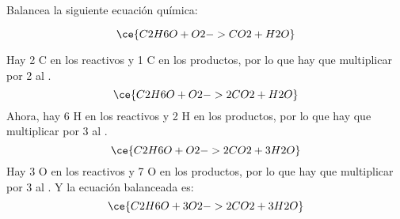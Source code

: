 Balancea la siguiente ecuación química:

\[
    \ce{C2H6O + O2 -> CO2 + H2O}
\]

\begin{solutionbox}{5cm}
    Hay 2 C  en los reactivos y 1 C  en los productos, por lo que hay que multiplicar por 2 al .
    \[
        \ce{C2H6O + O2 -> 2CO2 + H2O}
    \]
    Ahora, hay 6 H en los reactivos y 2 H en los productos, por lo que hay que multiplicar por 3 al .
    \[
        \ce{C2H6O + O2 -> 2CO2 + 3H2O}
    \]
    Hay 3 O en los reactivos y 7 O en los productos, por lo que hay que multiplicar por 3 al . Y la ecuación balanceada es:
    \[
        \ce{C2H6O + 3O2 -> 2CO2 + 3H2O}
    \]
\end{solutionbox}